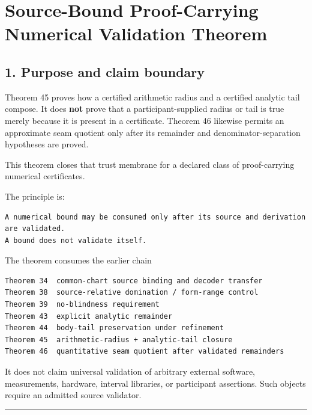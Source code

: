 \hypertarget{source-bound-proof-carrying-numerical-validation-theorem}{%
\chapter{Source-Bound Proof-Carrying Numerical Validation Theorem}\label{source-bound-proof-carrying-numerical-validation-theorem}}

\hypertarget{purpose-and-claim-boundary}{%
\section{1. Purpose and claim boundary}\label{purpose-and-claim-boundary}}

Theorem 45 proves how a certified arithmetic radius and a certified analytic tail compose. It does \textbf{not} prove that a participant-supplied radius or tail is true merely because it is present in a certificate. Theorem 46 likewise permits an approximate seam quotient only after its remainder and denominator-separation hypotheses are proved.

This theorem closes that trust membrane for a declared class of proof-carrying numerical certificates.

The principle is:

\begin{verbatim}
A numerical bound may be consumed only after its source and derivation are validated.
A bound does not validate itself.
\end{verbatim}

The theorem consumes the earlier chain

\begin{verbatim}
Theorem 34  common-chart source binding and decoder transfer
Theorem 38  source-relative domination / form-range control
Theorem 39  no-blindness requirement
Theorem 43  explicit analytic remainder
Theorem 44  body-tail preservation under refinement
Theorem 45  arithmetic-radius + analytic-tail closure
Theorem 46  quantitative seam quotient after validated remainders
\end{verbatim}

It does not claim universal validation of arbitrary external software, measurements, hardware, interval libraries, or participant assertions. Such objects require an admitted source validator.

\begin{center}\rule{0.5\linewidth}{0.5pt}\end{center}

